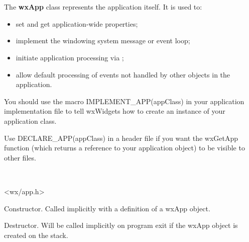 \section{}\label{wxapp}

The {\bf wxApp} class represents the application itself. It is used
to:

\begin{itemize}\itemsep=0pt
\item set and get application-wide properties;
\item implement the windowing system message or event loop;
\item initiate application processing via ;
\item allow default processing of events not handled by other
objects in the application.
\end{itemize}

You should use the macro IMPLEMENT\_APP(appClass) in your application implementation
file to tell wxWidgets how to create an instance of your application class.

Use DECLARE\_APP(appClass) in a header file if you want the wxGetApp function (which returns
a reference to your application object) to be visible to other files.


\\


<wx/app.h>





\label{wxappctor}


Constructor. Called implicitly with a definition of a wxApp object.


\label{wxappdtor}


Destructor. Will be called implicitly on program exit if the wxApp
object is created on the stack.


\label{wxappargc}


